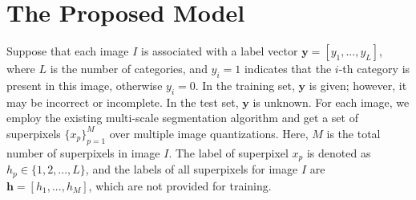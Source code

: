
\section{The Proposed Model}



Suppose that  each image $I$ is associated with a label vector $\boldsymbol{y} = [y_1,...,y_L]$,  where $L$ is the number of categories, and  $y_i=1$ indicates that the $i$-th category is present in this image, otherwise $y_i=0$. In the training set,  $\boldsymbol{y}$ is given; however, it may be incorrect or incomplete. In the test set, $\boldsymbol{y}$ is unknown.
For each image, we employ the existing multi-scale segmentation algorithm and get a set of superpixels   $\{x_p\}_{p=1}^M$ over multiple image quantizations.  Here,  $M$ is the total number of superpixels in image $I$.  The label of  superpixel  $x_p$ is denoted as  $h_p\in \{1,2,...,L\}$, and the labels of all superpixels for image $I$ are $\boldsymbol{h}=[h_1,...,h_M]$, which are not provided for training.

